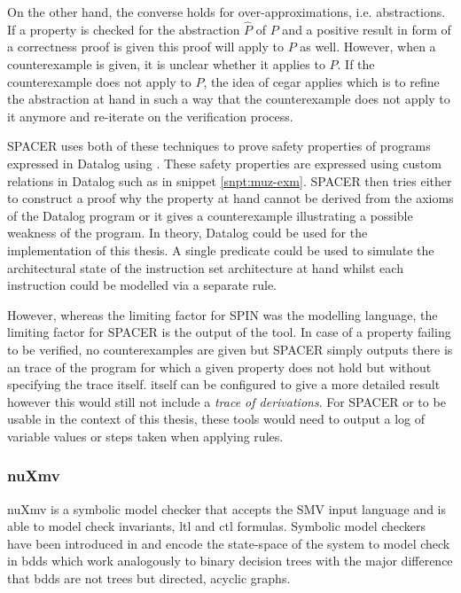 On the other hand, the converse holds for over-approximations, i.e. abstractions.
If a property is checked for the abstraction $ \hat{P} $ of $ P $ and a positive result in form of a correctness proof is given this proof will apply to $ P $ as well.
However, when a counterexample is given, it is unclear whether it applies to $ P $.
If the counterexample does not apply to $ P $, the idea of \gls{cegar} \cite{Clark00} applies which is to refine the abstraction at hand in such a way that the counterexample does not apply to it anymore and re-iterate on the verification process.

SPACER uses both of these techniques to prove safety properties of programs expressed in Datalog using \muZ{}.
These safety properties are expressed using custom relations in Datalog such as  in snippet \ref{snpt:muz-exm}.
SPACER then tries either to construct a proof why the property at hand cannot be derived from the axioms of the Datalog program or it gives a counterexample illustrating a possible weakness of the program.
In theory, Datalog could be used for the implementation of this thesis.
A single predicate could be used to simulate the architectural state of the instruction set architecture at hand whilst each instruction could be modelled via a separate rule.

However, whereas the limiting factor for SPIN was the modelling language, the limiting factor for SPACER is the output of the tool.
In case of a property failing to be verified, no counterexamples are given but SPACER simply outputs there is an trace of the program for which a given property does not hold but without specifying the trace itself.
\muZ{} itself can be configured to give a more detailed result however this would still not include a \textit{trace of derivations}.
For SPACER or \muZ{} to be usable in the context of this thesis, these tools would need to output a log of variable values or steps taken when applying rules.

\subsubsection{nuXmv}
\label{sec:nuxmv}

nuXmv \cite{Cavada14} is a symbolic model checker that accepts the SMV input language and is able to model check invariants, \gls{ltl} and \gls{ctl} formulas.
Symbolic model checkers have been introduced in \cite{Burch92} and encode the state-space of the system to model check in \glspl{bdd} which work analogously to binary decision trees with the major difference that \glspl{bdd} are not trees but directed, acyclic graphs.

